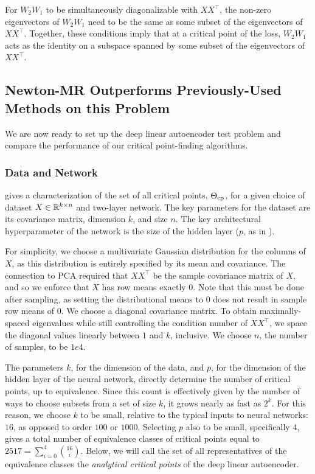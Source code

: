 \documentclass[../../thesis.tex]{subfiles}
\begin{document}
For $W_2 W_1$ to be simultaneously diagonalizable with $XX^\top$,
the non-zero eigenvectors of $W_2W_1$
need to be the same as some subset of the eigenvectors of $XX^\top$.
Together, these conditions imply that
at a critical point of the loss,
$W_2W_1$ acts as the identity
on a subspace spanned by some subset of the eigenvectors of $XX^\top$.

\subsection{Newton-MR Outperforms Previously-Used Methods on this Problem}%

We are now ready to set up the deep linear autoencoder
test problem and compare the performance of our
critical point-finding algorithms.

\subsubsection{Data and Network}

 gives a characterization
of the set of all critical points, $\Theta_{\mathrm{cp}}$,
for a given choice of dataset $X\in\mathbb{R}^{k \times n}$ and two-layer network.
The key parameters for the dataset are its covariance matrix,
dimension $k$, and size $n$.
The key architectural hyperparameter of the network is the
size of the hidden layer
($p$, as in ).

For simplicity, we choose a multivariate Gaussian distribution
for the columns of $X$,
as this distribution is entirely specified by its mean and covariance.
The connection to PCA
required that $XX^\top$ be the sample covariance matrix of $X$,
and so we enforce that $X$ has row means exactly $0$.
Note that this must be done after sampling,
as setting the distributional means to $0$ does not
result in sample row means of $0$.
We choose a diagonal covariance matrix.
To obtain maximally-spaced eigenvalues while still
controlling the condition number of $XX^\top$,
we space the diagonal values linearly between $1$ and $k$,
inclusive.
We choose $n$, the number of samples, to be $1e4$.

The parameters $k$, for the dimension of the data,
and $p$, for the dimension of the hidden layer of the neural network,
directly determine the number of critical points,
up to equivalence.
Since this count is effectively
given by the number of ways to choose subsets from a set of size $k$,
it grows nearly as fast as $2^k$.
For this reason, we choose $k$ to be small, relative to the typical
inputs to neural networks: $16$, as opposed to order $100$ or $1000$.
Selecting $p$ also to be small, specifically $4$,
gives a total number of equivalence classes of critical points equal to
$2517 = \sum_{i=0}^4 \binom{16}{i}$.
Below, we will call the set of all representatives of the
equivalence classes the \emph{analytical critical points}
of the deep linear autoencoder.
\end{document}

